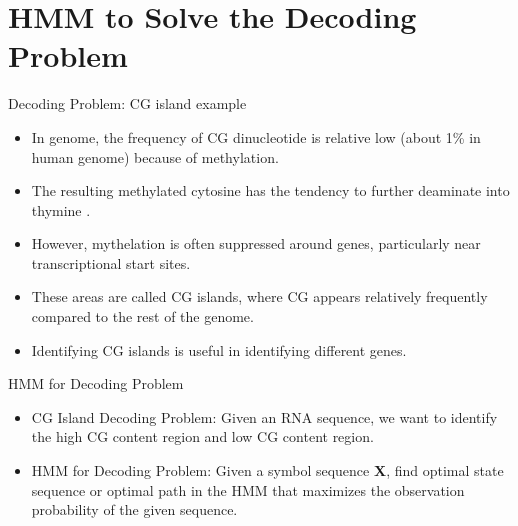 \documentclass{beamer}
\begin{document}
\section{HMM to Solve the Decoding Problem}
\begin{frame}{Decoding Problem: CG island example}
	\begin{itemize}
		\item In genome, the frequency of CG dinucleotide is relative low (about 1\% in human genome) because of methylation. 
		\item The resulting methylated cytosine has the tendency to further deaminate into thymine \cite{compeau2018bioinformatics}.
		\item However, mythelation is often suppressed around genes, particularly near transcriptional start sites.
		\item These areas are called CG islands, where CG appears relatively frequently compared to the rest of the genome.
		\item Identifying CG islands is useful in identifying different genes.
	\end{itemize}
\end{frame}

\begin{frame}{HMM for Decoding Problem}
	\begin{itemize}
		\item CG Island Decoding Problem: Given an RNA sequence, we want to identify the high CG content region and low CG content region.
		\item HMM for Decoding Problem: Given a symbol sequence \textbf{X}, find optimal state sequence or optimal path in the HMM that maximizes the observation probability of the given sequence.
	\end{itemize}
\end{frame}
\end{document}
